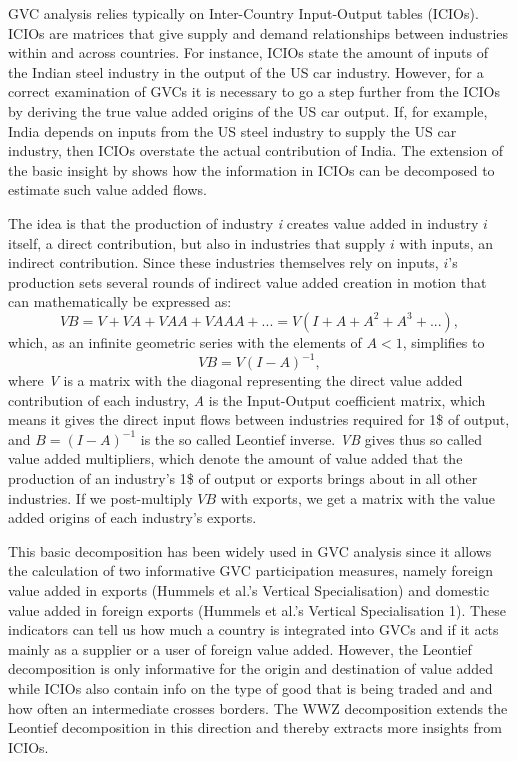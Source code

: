 \documentclass[11pt,a4paper]{article}
\begin{document}
GVC analysis relies typically on Inter-Country Input-Output tables (ICIOs). ICIOs are matrices that give supply and demand relationships between industries within and across countries. For instance, ICIOs state the amount of inputs of the Indian steel industry in the output of the US car industry. However, for a correct examination of GVCs it is necessary to go a step further from the ICIOs by deriving the true value added origins of the US car output. If, for example, India depends on inputs from the US steel industry to supply the US car industry, then ICIOs overstate the actual contribution of India. The extension of the basic \citet{wale36} insight by \citet{dahuetal01} shows how the information in ICIOs can be decomposed to estimate such value added flows.

The idea is that the production of industry \textit{i} creates value added in industry $i$ itself, a direct contribution, but also in industries that supply $i$ with inputs, an indirect contribution. Since these industries themselves rely on inputs, $i$'s production sets several rounds of indirect value added creation in motion that can mathematically be expressed as:
\begin{equation}
VB = V + VA + VAA + VAAA + ... = V (I+A+A^{2}+A^{3}+...),
\end{equation}
which, as an infinite geometric series with the elements of $A<1$, simplifies to
\begin{equation}
VB = V (I-A)^{-1},
\end{equation}
where \textit{V} is a matrix with the diagonal representing the direct value added contribution of each industry, \textit{A} is the Input-Output coefficient matrix, which means it gives the direct input flows between industries required for 1\$ of output, and $B = (I-A)^{-1}$ is the so called Leontief inverse. \textit{VB} gives thus so called value added multipliers, which denote the amount of value added that the production of an industry's 1\$ of output or exports brings about in all other industries. If we post-multiply $VB$ with exports, we get a matrix with the value added origins of each industry's exports.
 
This basic decomposition has been widely used in GVC analysis since it allows the calculation of two informative GVC participation measures, namely foreign value added in exports (Hummels et al.'s Vertical Specialisation) and domestic value added in foreign exports (Hummels et al.'s Vertical Specialisation 1). These indicators can tell us how much a country is integrated into GVCs and if it acts mainly as a supplier or a user of foreign value added. However, the Leontief decomposition is only informative for the origin and destination of value added while ICIOs also contain info on the type of good that is being traded and and how often an intermediate crosses borders. The WWZ decomposition extends the Leontief decomposition in this direction and thereby extracts more insights from ICIOs.
\end{document}
